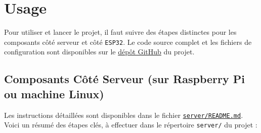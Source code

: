 \documentclass[12pt]{article}
\begin{document}
\section{Usage}

Pour utiliser et lancer le projet, il faut suivre des étapes distinctes pour les composants côté serveur et côté \texttt{ESP32}. Le code source complet et les fichiers de configuration sont disponibles sur le \href{https://github.com/GreengagePlum/Project-IOT}{dépôt GitHub} du projet.

\subsection{Composants Côté Serveur (sur Raspberry Pi ou machine Linux)}

Les instructions détaillées sont disponibles dans le fichier \href{https://github.com/GreengagePlum/Project-IOT/blob/v1.0.0/server/README.md}{\texttt{server/README.md}}. Voici un résumé des étapes clés, à effectuer dans le répertoire \texttt{server/} du projet :
\end{document}

